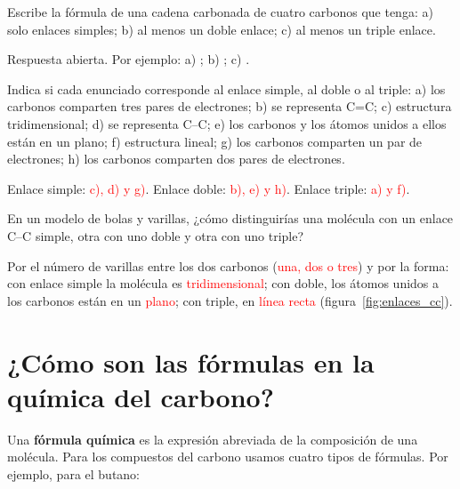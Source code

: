 \begin{exercise}
    Escribe la fórmula de una cadena carbonada de cuatro carbonos que tenga: a) solo enlaces simples; b) al menos un doble enlace; c) al menos un triple enlace.
    \begin{solu}
        Respuesta abierta. Por ejemplo: a) \textcolor{red}{}; b) \textcolor{red}{}; c) \textcolor{red}{}.
    \end{solu}
\end{exercise}

\begin{exercise}
    Indica si cada enunciado corresponde al enlace simple, al doble o al triple:
    a) los carbonos comparten tres pares de electrones; b) se representa C=C; c) estructura tridimensional; d) se representa C--C; e) los carbonos y los átomos unidos a ellos están en un plano; f) estructura lineal; g) los carbonos comparten un par de electrones; h) los carbonos comparten dos pares de electrones.
    \begin{solu}
        Enlace simple: \textcolor{red}{c), d) y g)}. Enlace doble: \textcolor{red}{b), e) y h)}. Enlace triple: \textcolor{red}{a) y f)}.
    \end{solu}
\end{exercise}

\begin{exercise}
    En un modelo de bolas y varillas, ¿cómo distinguirías una molécula con un enlace C--C simple, otra con uno doble y otra con uno triple?
    \begin{solu}
        Por el número de varillas entre los dos carbonos (\textcolor{red}{una, dos o tres}) y por la forma: con enlace simple la molécula es \textcolor{red}{tridimensional}; con doble, los átomos unidos a los carbonos están en un \textcolor{red}{plano}; con triple, en \textcolor{red}{línea recta} (figura~\ref{fig:enlaces_cc}).
    \end{solu}
\end{exercise}

\section{¿Cómo son las fórmulas en la química del carbono?}

Una \textbf{fórmula química} es la expresión abreviada de la composición de una molécula. Para los compuestos del carbono usamos cuatro tipos de fórmulas. Por ejemplo, para el butano:

